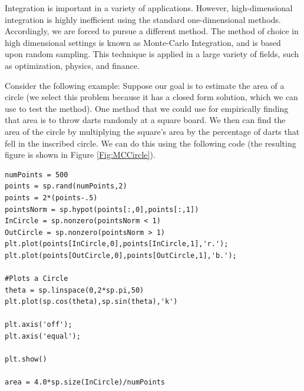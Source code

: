 


Integration is important in a variety of applications. However, high-dimensional integration is highly inefficient using the standard one-dimensional methods. Accordingly, we are forced to pursue a different method. The method of choice in high dimensional settings is known as Monte-Carlo Integration, and is based upon random sampling. This technique is applied in a large variety of fields, such as optimization, physics, and finance.

Consider the following example: Suppose our goal is to estimate the area of a circle (we select this problem because it has a closed form solution, which we can use to test the method). One method that we could use for empirically finding that area is to throw darts randomly at a square board. We then can find the area of the circle by multiplying the square's area by the percentage of darts that fell in the inscribed circle. We can do this using the following code (the resulting figure is shown in Figure \ref{Fig:MCCircle}).


\begin{lstlisting}[style=python]
numPoints = 500
points = sp.rand(numPoints,2)
points = 2*(points-.5)
pointsNorm = sp.hypot(points[:,0],points[:,1])
InCircle = sp.nonzero(pointsNorm < 1)
OutCircle = sp.nonzero(pointsNorm > 1)
plt.plot(points[InCircle,0],points[InCircle,1],'r.');
plt.plot(points[OutCircle,0],points[OutCircle,1],'b.');

#Plots a Circle
theta = sp.linspace(0,2*sp.pi,50)
plt.plot(sp.cos(theta),sp.sin(theta),'k')

plt.axis('off');
plt.axis('equal');

plt.show()

area = 4.0*sp.size(InCircle)/numPoints

\end{lstlisting}

